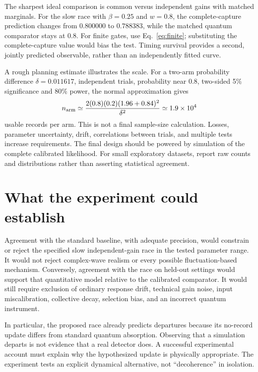 \documentclass[11pt]{article}
\begin{document}
The sharpest ideal comparison is common versus independent gains with matched marginals. For the slow race with $\beta=0.25$ and $w=0.8$, the complete-capture prediction changes from $0.800000$ to $0.788383$, while the matched quantum comparator stays at $0.8$. For finite gates, use Eq.~\eqref{eq:finite}; substituting the complete-capture value would bias the test. Timing survival provides a second, jointly predicted observable, rather than an independently fitted curve.

A rough planning estimate illustrates the scale. For a two-arm probability difference $\delta=0.011617$, independent trials, probability near $0.8$, two-sided 5\% significance and 80\% power, the normal approximation gives
\begin{equation}
 n_{\rm arm}\simeq\frac{2(0.8)(0.2)(1.96+0.84)^2}{\delta^2}
 \simeq 1.9\times10^4
\end{equation}
usable records per arm. This is not a final sample-size calculation. Losses, parameter uncertainty, drift, correlations between trials, and multiple tests increase requirements. The final design should be powered by simulation of the complete calibrated likelihood. For small exploratory datasets, report raw counts and distributions rather than asserting statistical agreement.

\section{What the experiment could establish}
Agreement with the standard baseline, with adequate precision, would constrain or reject the specified slow independent-gain race in the tested parameter range. It would not reject complex-wave realism or every possible fluctuation-based mechanism. Conversely, agreement with the race on held-out settings would support that quantitative model relative to the calibrated comparator. It would still require exclusion of ordinary response drift, technical gain noise, input miscalibration, collective decay, selection bias, and an incorrect quantum instrument.

In particular, the proposed race already predicts departures because its no-record update differs from standard quantum absorption. Observing that a simulation departs is not evidence that a real detector does. A successful experimental account must explain why the hypothesized update is physically appropriate. The experiment tests an explicit dynamical alternative, not ``decoherence'' in isolation.
\end{document}
